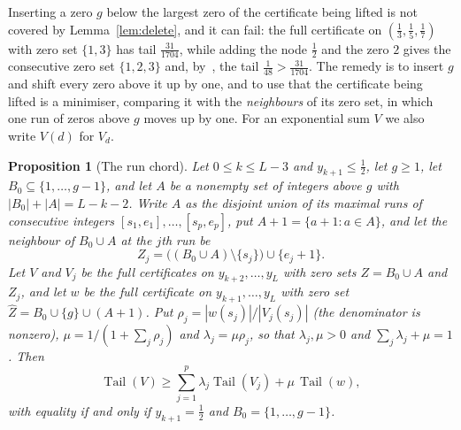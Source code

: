 \documentclass[11pt]{article}
\newtheorem{proposition}[theorem]{Proposition}
\theoremstyle{definition}
\theoremstyle{plain}
\DeclareMathOperator{\Tail}{Tail}
\begin{document}
Inserting a zero $g$ below the largest zero of the certificate being lifted
is not covered by Lemma~\ref{lem:delete}, and it can fail: the full
certificate on $(\tfrac13,\tfrac15,\tfrac17)$ with zero set $\{1,3\}$ has tail
$\tfrac{31}{1704}$, while adding the node $\tfrac12$ and the zero $2$ gives the
consecutive zero set $\{1,2,3\}$ and, by~\cite[Lemma~2.1]{coefficient-mass}, the tail
$\tfrac1{48}>\tfrac{31}{1704}$.  The remedy is to insert $g$ and shift every
zero above it up by one, and to use that the certificate being lifted is a
minimiser, comparing it with the \emph{neighbours} of its zero set, in which
one run of zeros above $g$ moves up by one.  For an exponential sum $V$ we
also write $V(d)$ for $V_d$.

\begin{proposition}[The run chord]\label{prop:runchord}
Let $0\le k\le L-3$ and $y_{k+1}\le\tfrac12$, let $g\ge1$, let
$B_0\subseteq\{1,\ldots,g-1\}$, and let $A$ be a nonempty set of integers
above $g$ with $|B_0|+|A|=L-k-2$.  Write $A$ as the disjoint union of its
maximal runs of consecutive integers $[s_1,e_1],\ldots,[s_p,e_p]$, put
$A+1=\{a+1:a\in A\}$, and let the neighbour of $B_0\cup A$ at the $j$th run
be
\[
  Z_j=\bigl((B_0\cup A)\setminus\{s_j\}\bigr)\cup\{e_j+1\}.
\]
Let $V$ and $V_j$ be the full certificates on
$y_{k+2},\ldots,y_L$ with zero sets $Z=B_0\cup A$ and $Z_j$, and let $w$ be
the full certificate on $y_{k+1},\ldots,y_L$ with zero set
$\widehat Z=B_0\cup\{g\}\cup(A+1)$.  Put $\rho_j=|w(s_j)|/|V_j(s_j)|$ (the
denominator is nonzero), $\mu=1/(1+\sum_j\rho_j)$ and $\lambda_j=\mu\rho_j$,
so that $\lambda_j,\mu>0$ and $\sum_j\lambda_j+\mu=1$.  Then
\begin{equation}\label{eq:runchord}
  \Tail(V)\ge\sum_{j=1}^p\lambda_j\Tail(V_j)+\mu\,\Tail(w),
\end{equation}
with equality if and only if $y_{k+1}=\tfrac12$ and $B_0=\{1,\ldots,g-1\}$.
\end{proposition}
\end{document}
